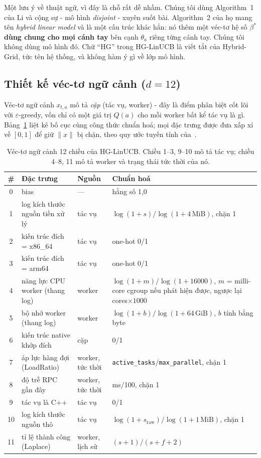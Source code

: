 \documentclass[final,5p,times,twocolumn]{elsarticle}
\begin{document}
Một lưu ý về thuật ngữ, vì đây là chỗ rất dễ nhầm. Chúng tôi dùng Algorithm~1 của Li và cộng sự - mô hình \emph{disjoint} - xuyên suốt bài. Algorithm~2 của họ mang tên \emph{hybrid linear model} và là một cấu trúc khác hẳn: nó thêm một véc-tơ hệ số $\beta^*$ \textbf{dùng chung cho mọi cánh tay} bên cạnh $\theta_a$ riêng từng cánh tay. Chúng tôi không dùng mô hình đó. Chữ ``HG'' trong HG-LinUCB là viết tắt của Hybrid-Grid, tức tên hệ thống, và không hàm ý gì về lớp mô hình.

\subsection{Thiết kế véc-tơ ngữ cảnh ($d=12$)}
\label{sec:context}

Véc-tơ ngữ cảnh $x_{t,a}$ mô tả \emph{cặp} (tác vụ, worker) - đây là điểm phân biệt cốt lõi với $\varepsilon$-greedy, vốn chỉ có một giá trị $Q(a)$ cho mỗi worker bất kể tác vụ là gì. Bảng~\ref{tab:features} liệt kê bố cục cùng công thức chuẩn hoá; mọi đặc trưng được đưa xấp xỉ về $[0,1]$ để giữ $\|x\|$ bị chặn, theo quy ước tuyến tính của~\cite{chu2011}.

\begin{table}[t]
\centering
\caption{Véc-tơ ngữ cảnh 12 chiều của HG-LinUCB. Chiều 1--3, 9--10 mô tả tác vụ; chiều 4--8, 11 mô tả worker và trạng thái tức thời của nó.}
\label{tab:features}
\small
\begin{tabular}{cllp{7.6cm}}
\toprule
\# & Đặc trưng & Nguồn & Chuẩn hoá \\
\midrule
0  & bias & --- & hằng số 1,0 \\
1  & log kích thước nguồn tiền xử lý & tác vụ & $\log(1+s)/\log(1+4\,\text{MiB})$, chặn 1 \\
2  & kiến trúc đích = x86\_64 & tác vụ & one-hot 0/1 \\
3  & kiến trúc đích = arm64 & tác vụ & one-hot 0/1 \\
4  & năng lực CPU worker (thang log) & worker & $\log(1+m)/\log(1+16000)$, $m$ = milli-core cgroup nếu phát hiện được, ngược lại cores$\times1000$ \\
5  & bộ nhớ worker (thang log) & worker & $\log(1+b)/\log(1+64\,\text{GiB})$, $b$ tính bằng byte \\
6  & kiến trúc native khớp đích & cặp & 0/1 \\
7  & áp lực hàng đợi (LoadRatio) & worker, tức thời & \texttt{active\_tasks}/\texttt{max\_parallel}, chặn 1 \\
8  & độ trễ RPC gần đây & worker, tức thời & ms/100, chặn 1 \\
9  & tác vụ là C++ & tác vụ & 0/1 \\
10 & log kích thước nguồn thô & tác vụ & $\log(1+s_{\text{raw}})/\log(1+1\,\text{MiB})$, chặn 1 \\
11 & tỉ lệ thành công (Laplace) & worker, lịch sử & $(s+1)/(s+f+2)$ \\
\bottomrule
\end{tabular}
\end{table}
\end{document}
